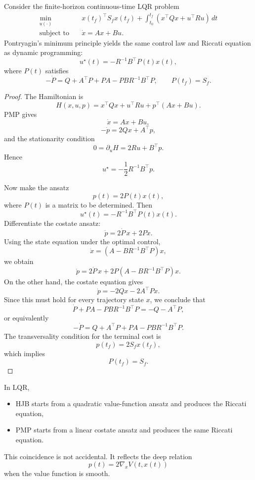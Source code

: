 \begin{theorem}\label{thm:l6-pmp-derivation-of-the-continuous-time-riccati-equation}
	Consider the finite-horizon continuous-time LQR problem
	\begin{align*}
		\min_{u(\cdot)} \quad & x(t_f)^\top S_f x(t_f) + \int_{t_0}^{t_f}\left(x^\top Q x + u^\top R u\right)\,dt \\
		\text{subject to}\quad & \dot x = A x + B u.
	\end{align*}
	Pontryagin's minimum principle yields the same control law and Riccati equation as dynamic programming:
	\[
		u^\star(t)=-R^{-1}B^\top P(t)x(t),
	\]
	where $P(t)$ satisfies
	\[
		-\dot P
		=
		Q + A^\top P + P A - P B R^{-1}B^\top P,
		\qquad
		P(t_f)=S_f.
	\]
\end{theorem}
\begin{proof}
	The Hamiltonian is
	\[
		H(x,u,p)=x^\top Q x + u^\top R u + p^\top(Ax+Bu).
	\]
	PMP gives
	\[
		\dot x = A x + B u,
	\]
	\[
		-\dot p = 2Qx + A^\top p,
	\]
	and the stationarity condition
	\[
		0 = \partial_u H = 2Ru + B^\top p.
	\]
	Hence
	\[
		u^\star = -\frac{1}{2}R^{-1}B^\top p.
	\]

	Now make the ansatz
	\[
		p(t)=2P(t)x(t),
	\]
	where $P(t)$ is a matrix to be determined. Then
	\[
		u^\star(t)=-R^{-1}B^\top P(t)x(t).
	\]
	Differentiate the costate ansatz:
	\[
		\dot p = 2\dot P\,x + 2P\dot x.
	\]
	Using the state equation under the optimal control,
	\[
		\dot x = \left(A-BR^{-1}B^\top P\right)x,
	\]
	we obtain
	\[
		\dot p
		=
		2\dot P\,x + 2P\left(A-BR^{-1}B^\top P\right)x.
	\]
	On the other hand, the costate equation gives
	\[
		\dot p = -2Qx - 2A^\top P x.
	\]
	Since this must hold for every trajectory state $x$, we conclude that
	\[
		\dot P + P A - P B R^{-1}B^\top P = -Q - A^\top P,
	\]
	or equivalently
	\[
		-\dot P
		=
		Q + A^\top P + P A - P B R^{-1}B^\top P.
	\]
	The transversality condition for the terminal cost is
	\[
		p(t_f)=2S_f x(t_f),
	\]
	which implies
	\[
		P(t_f)=S_f.
	\]
\end{proof}

\begin{remark}
	In LQR,
	\begin{itemize}
		\item HJB starts from a quadratic value-function ansatz and produces the Riccati equation,
		\item PMP starts from a linear costate ansatz and produces the same Riccati equation.
	\end{itemize}
	This coincidence is not accidental. It reflects the deep relation
	\[
		p(t)=2\nabla_x V(t,x(t))
	\]
	when the value function is smooth.
\end{remark}
